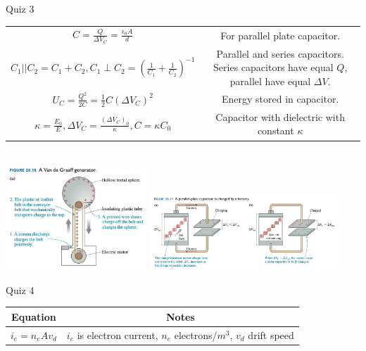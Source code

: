 \documentclass{article}
\newcommand{\eps}{\epsilon_0}
\begin{document}
\begin{center}
\begin{section}{Quiz 3}
\begin{tabular}{|c|c|}
		 $C = \frac{Q}{\Delta V_C} = \frac{\eps A}{d}$                                  & For parallel plate capacitor.                                               \\

		 $C_1 || C_2 = C_1 + C_2, C_1 \perp C_2 = (\frac{1}{C_1} + \frac{1}{C_2})^{-1}$ & \makecell{Parallel and series capacitors. Series capacitors have equal $Q$, \\
		 parallel have equal $\Delta V$.}                                                                                                                             \\

		 $U_C = \frac{Q^2}{2 C} = \frac{1}{2} C (\Delta V_C)^2$                         & Energy stored in capacitor.                                                 \\
		 $\kappa = \frac{E_0}{E}, \Delta V_C
		 = \frac{(\Delta V_C)_0}{\kappa}, C = \kappa C_0$                               & Capacitor with dielectric with constant $\kappa$                            \\

		 \hline
	 \end{tabular}
	 \\
	 \includegraphics[width=150pt]{final_cheet_sheet_resources/gvotcdmxjpwdvcicmenhqcknyxedpudu.jpg}
	 \includegraphics[width=200pt]{final_cheet_sheet_resources/khlzwxxfhkebtizrrtyhiwmbjhtfbalk.jpg}
	\end{section}

	\begin{section}{Quiz 4}
	 \begin{tabular}{|c|c|}
		 \hline
		 Equation                                                                               & Notes                                                               \\
		 \hline
		 $i_e = n_e A v_d$                                                                      & $i_e$ is electron current, $n_e$ electrons/$m^3$, $v_d$ drift speed \\


\end{tabular}
\end{section}
\end{center}
\end{document}
